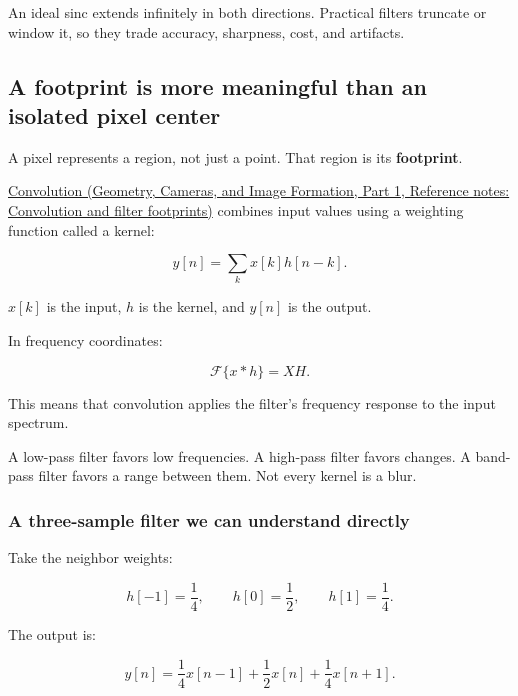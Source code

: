 An ideal sinc extends infinitely in both directions. Practical filters truncate or window it, so they trade accuracy, sharpness, cost, and artifacts.

\subsection{A footprint is more meaningful than an isolated pixel center}\label{04-visual-computing-ii-ch042-a-footprint-is-more-meaningful-than-an-isolated-pixel-center}

\hypertarget{04-visual-computing-ii-ch042-a-footprint-is-more-meaningful-than-an-isolated-pixel-center}{}

A pixel represents a region, not just a point. That region is its \textbf{footprint}.

\href{../03-Geometry-Cameras-and-Image-Formation-P01/main.pdf\#nameddest=appendix-d5b3c692d9f0}{Convolution (Geometry, Cameras, and Image Formation, Part 1, Reference notes: Convolution and filter footprints)} combines input values using a weighting function called a kernel:

\[
y[n]=\sum_k x[k]h[n-k].
\]

\(x[k]\) is the input, \(h\) is the kernel, and \(y[n]\) is the output.

In frequency coordinates:

\[
\mathcal F\{x*h\}=XH.
\]

This means that convolution applies the filter's frequency response to the input spectrum.

A low-pass filter favors low frequencies. A high-pass filter favors changes. A band-pass filter favors a range between them. Not every kernel is a blur.

\subsubsection{A three-sample filter we can understand directly}\label{04-visual-computing-ii-ch042-a-three-sample-filter-we-can-understand-directly}

\hypertarget{04-visual-computing-ii-ch042-a-three-sample-filter-we-can-understand-directly}{}

Take the neighbor weights:

\[
h[-1]=\frac14,\qquad h[0]=\frac12,\qquad h[1]=\frac14.
\]

The output is:

\[
y[n]=\frac14x[n-1]+\frac12x[n]+\frac14x[n+1].
\]

